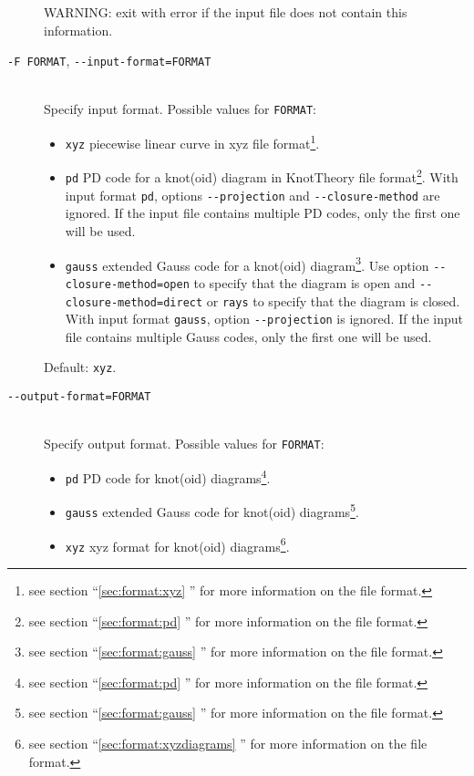\begin{description}
  WARNING: exit with error if the input file does not contain this information.
\item[\lstinline{-F FORMAT}, \lstinline{--input-format=FORMAT}]\hfill\\
  Specify input format. Possible values for \lstinline{FORMAT}:
  \begin{itemize}
  \item \lstinline{xyz} piecewise linear curve in xyz file format\footnote{see section ``\ref{sec:format:xyz} '' for more information on the file format.}.
  \item \lstinline{pd} PD code for a knot(oid) diagram in KnotTheory file format\footnote{see section ``\ref{sec:format:pd} ''  for more information on the file format.}.  With input format \lstinline{pd}, options \lstinline{--projection} and  \lstinline{--closure-method} are ignored. 
    If the input file contains multiple PD codes, only the first one will be used.
  \item \lstinline{gauss} extended Gauss code for a knot(oid) diagram\footnote{see section ``\ref{sec:format:gauss} ''  for more information on the file format.}. Use option \lstinline{--closure-method=open} to specify that the diagram is open and \lstinline{--closure-method=direct} or \lstinline{rays} to specify that the diagram is closed. With input format \lstinline{gauss}, option \lstinline{--projection} is ignored.
    If the input file contains multiple Gauss codes, only the first one will be used.
  \end{itemize}
  Default: \lstinline{xyz}.
\item[\lstinline{--output-format=FORMAT}]\hfill\\
  Specify output format. Possible values for \lstinline{FORMAT}:
  \begin{itemize}
  \item \lstinline{pd} PD code for knot(oid) diagrams\footnote{see section ``\ref{sec:format:pd} ''  for more information on the file format.}. 
  \item \lstinline{gauss} extended Gauss code for knot(oid) diagrams\footnote{see section ``\ref{sec:format:gauss} ''  for more information on the file format.}.
  \item \lstinline{xyz} xyz format for knot(oid) diagrams\footnote{see section ``\ref{sec:format:xyzdiagrams} '' for more information on the file format.}.
  \end{itemize}

\end{description}
